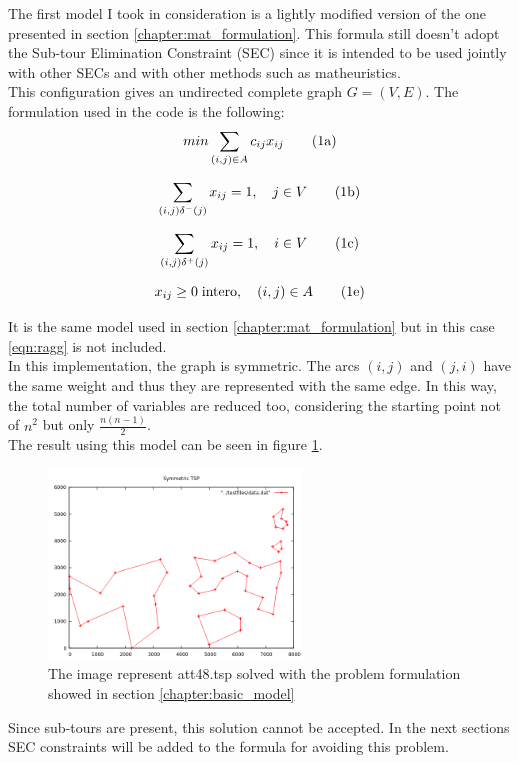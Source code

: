 The first model I took in consideration is a lightly modified version of the one presented in section \ref{chapter:mat_formulation}. This formula still doesn't adopt the Sub-tour Elimination Constraint (SEC) since it is intended to be used jointly with other SECs and with other methods such as matheuristics.\\
This configuration gives an undirected complete graph $G=(V,E)$. The formulation used in the code is the following:
	\begin{equation}
	\label{eqn:cost-2}
	min\sum_{(i,j)\in A}c_{ij}x_{ij}
	\stepcounter{equation}\tag{{\theequation}a}
	\end{equation}
	
	\begin{equation}
	\label{eqn:in-2}
	\sum_{(i,j)\delta^-(j)}x_{ij}=1, \quad j\in V
	\tag{{\theequation}b}
	\end{equation}
	
	\begin{equation}
	\label{eqn:out-2}
	\sum_{(i,j)\delta^+(j)}x_{ij}=1, \quad i\in V
	\tag{{\theequation}c}
	\end{equation}
	
	\begin{equation}
	x_{ij}\ge 0 \; \text{intero} , \quad (i, j) \in A
	\tag{{\theequation}e}
	\end{equation}


It is the same model used in section \ref{chapter:mat_formulation} but in this case \ref{eqn:ragg} is not included.\\
In this implementation, the graph is symmetric. The arcs $(i, j)$ and $(j, i)$ have the same weight and thus they are represented with the same edge. In this way, the total number of variables are reduced too, considering the starting point not of $n^2$ but only $\frac{n(n-1)}{2}$.\\
The result using this model can be seen in figure \ref{fig:basic_model}.

\begin{figure}[h]
	\centering
	\includegraphics[width=0.6\textwidth]{images/symmetric_with_tours.png}
	\caption{The image represent att48.tsp solved with the problem formulation showed in section \ref{chapter:basic_model}}
	\label{fig:basic_model}
\end{figure}

Since sub-tours are present, this solution cannot be accepted. In the next sections SEC constraints will be added to the formula for avoiding this problem.